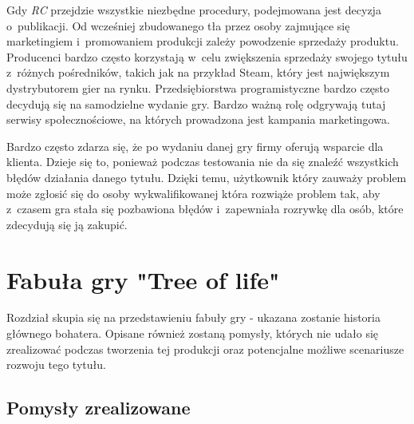 \documentclass[12pt,a4paper,oneside]{book}
\theoremstyle{definition}
\numberwithin{equation}{chapter}
\begin{document}
\par Gdy \textit{RC} przejdzie wszystkie niezbędne procedury, podejmowana jest decyzja o~publikacji. Od wcześniej zbudowanego tła przez osoby zajmujące się marketingiem i~promowaniem produkcji zależy powodzenie sprzedaży produktu. Producenci bardzo często korzystają w~celu zwiększenia sprzedaży swojego tytułu z~różnych pośredników, takich jak na przykład Steam\cite{Steam}, który jest największym dystrybutorem gier na rynku. Przedsiębiorstwa programistyczne bardzo często decydują się na samodzielne wydanie gry. Bardzo ważną rolę odgrywają tutaj serwisy społecznościowe, na których prowadzona jest kampania marketingowa.

\par Bardzo często zdarza się, że po wydaniu danej gry firmy oferują wsparcie dla klienta. Dzieje się to, ponieważ podczas testowania nie da się znaleźć wszystkich błędów działania danego tytułu. Dzięki temu, użytkownik który zauważy problem może zgłosić się do osoby wykwalifikowanej która rozwiąże problem tak, aby z~czasem gra stała się pozbawiona błędów i~zapewniała rozrywkę dla osób, które zdecydują się ją zakupić.



\chapter{Fabuła gry "Tree of life"}
\par Rozdział skupia się na przedstawieniu fabuły gry - ukazana zostanie historia głównego bohatera. Opisane również zostaną pomysły, których nie udało się zrealizować podczas tworzenia tej produkcji oraz potencjalne możliwe scenariusze rozwoju tego tytułu.

\section{Pomysły zrealizowane}
\end{document}
